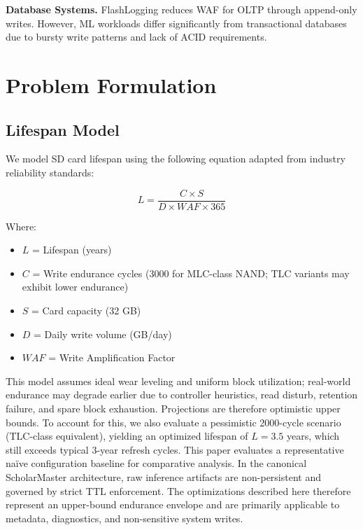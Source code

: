 \documentclass[conference]{IEEEtran}
\begin{document}
\textbf{Database Systems.} FlashLogging reduces WAF for OLTP through append-only writes. However, ML workloads differ significantly from transactional databases due to bursty write patterns and lack of ACID requirements.

\section{Problem Formulation}

\subsection{Lifespan Model}

We model SD card lifespan using the following equation adapted from industry reliability standards:

\begin{equation}
L = \frac{C \times S}{D \times WAF \times 365}
\label{eq:lifespan}
\end{equation}

Where:
\begin{itemize}
    \item $L$ = Lifespan (years)
    \item $C$ = Write endurance cycles (3000 for MLC-class NAND; TLC variants may exhibit lower endurance)
    \item $S$ = Card capacity (32 GB)
    \item $D$ = Daily write volume (GB/day)
    \item $WAF$ = Write Amplification Factor
\end{itemize}

This model assumes ideal wear leveling and uniform block utilization; real-world endurance may degrade earlier due to controller heuristics, read disturb, retention failure, and spare block exhaustion. Projections are therefore optimistic upper bounds. To account for this, we also evaluate a pessimistic 2000-cycle scenario (TLC-class equivalent), yielding an optimized lifespan of $L = 3.5$ years, which still exceeds typical 3-year refresh cycles. This paper evaluates a representative na\"ive configuration baseline for comparative analysis. In the canonical ScholarMaster architecture, raw inference artifacts are non-persistent and governed by strict TTL enforcement. The optimizations described here therefore represent an upper-bound endurance envelope and are primarily applicable to metadata, diagnostics, and non-sensitive system writes.
\end{document}

